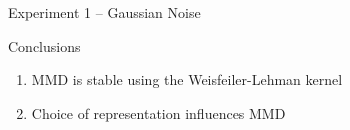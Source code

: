 \documentclass[aspectratio=169, 10pt, dvipsnames]{beamer}
\begin{document}
\begin{frame}[fragile]{Experiment 1 -- Gaussian Noise}
\begin{minipage}{0.38\linewidth}
  \begin{alert}{Conclusions}
    \begin{enumerate}
      \pause\item MMD is stable using the Weisfeiler-Lehman kernel
      \pause\item Choice of representation influences MMD
    \end{enumerate}
  \end{alert}
  \end{minipage}
\end{frame}
\end{document}
